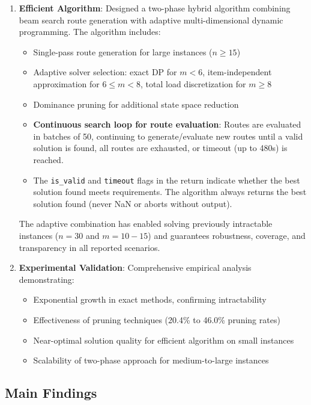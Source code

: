 \documentclass[12pt]{article}
\begin{document}
\begin{enumerate}
    \item \textbf{Efficient Algorithm}: Designed a two-phase hybrid algorithm combining beam search route generation with adaptive multi-dimensional dynamic programming. The algorithm includes:
    \begin{itemize}
        \item Single-pass route generation for large instances ($n \geq 15$)
        \item Adaptive solver selection: exact DP for $m < 6$, item-independent approximation for $6 \leq m < 8$, total load discretization for $m \geq 8$
        \item Dominance pruning for additional state space reduction
        \item \textbf{Continuous search loop for route evaluation}: Routes are evaluated in batches of 50, continuing to generate/evaluate new routes until a valid solution is found, all routes are exhausted, or timeout (up to 480s) is reached.
        \item The \texttt{is\_valid} and \texttt{timeout} flags in the return indicate whether the best solution found meets requirements. The algorithm always returns the best solution found (never NaN or aborts without output).
    \end{itemize}
    The adaptive combination has enabled solving previously intractable instances ($n=30$ and $m=10-15$) and guarantees robustness, coverage, and transparency in all reported scenarios.
    
    \item \textbf{Experimental Validation}: Comprehensive empirical analysis demonstrating:
    \begin{itemize}
        \item Exponential growth in exact methods, confirming intractability
        \item Effectiveness of pruning techniques (20.4\% to 46.0\% pruning rates)
        \item Near-optimal solution quality for efficient algorithm on small instances
        \item Scalability of two-phase approach for medium-to-large instances
    \end{itemize}
\end{enumerate}

\subsection{Main Findings}
\end{document}
